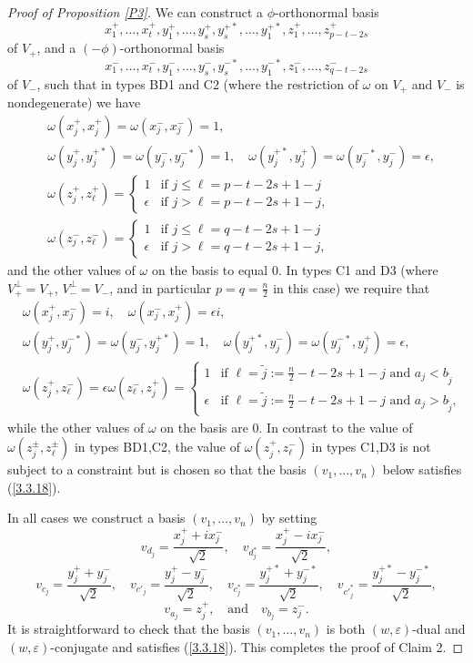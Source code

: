 \documentclass{amsart}
\theoremstyle{definition}
\begin{document}
\begin{proof}[Proof of Proposition \ref{P3}]
We can construct a $\phi$-orthonormal basis
\[x_1^+,\ldots,x_t^+,y^+_1,\ldots,y^+_s,y^{+*}_s,\ldots,y^{+*}_1,z^+_1,\ldots,z^+_{p-t-2s}\]
of $V_+$, and a $(-\phi)$-orthonormal basis
\[x_1^-,\ldots,x_t^-,y^-_1,\ldots,y^-_s,y^{-*}_s,\ldots,y^{-*}_1,z^-_1,\ldots,z^-_{q-t-2s}\]
of $V_-$,
such that in types BD1 and C2 (where the restriction of $\omega$ on $V_+$ and $V_-$ is nondegenerate) we have
\begin{eqnarray*}
 & \omega(x^+_j,x^+_j)=\omega(x^-_j,x^-_j)=1,\\ 
 & \omega(y^+_j,y^{+*}_j)=\omega(y^-_j,y^{-*}_j)=1,\quad\omega(y^{+*}_j,y^+_j)=\omega(y^{-*}_j,y^-_j)=\epsilon, \\
 & \omega(z^+_j,z^+_{\ell})=\left\{\begin{array}{ll} 1 & \mbox{if $j\leq \ell=p-t-2s+1-j$} \\ \epsilon & \mbox{if $j>\ell=p-t-2s+1-j, $} \end{array}\right.
\\
 & \omega(z^-_j,z^-_{\ell})=\left\{\begin{array}{ll} 1 & \mbox{if $j\leq \ell=q-t-2s+1-j$} \\ \epsilon & \mbox{if $j>\ell=q-t-2s+1-j, $} \end{array}\right.
\end{eqnarray*}
and the other values of $\omega$ on the basis to equal $0$.  In types C1 and D3 (where $V_+^\perp=V_+$, $V_-^\perp=V_-$, and in particular $p=q=\frac{n}{2}$ in this case) we require that
\begin{eqnarray*}
 & \omega(x^+_j,x^-_j)=i,\quad \omega(x^-_j,x^+_j)=\epsilon i,\\ 
 & \omega(y^+_j,y^{-*}_j)=\omega(y^-_j,y^{+*}_j)=1,\quad\omega(y^{+*}_j,y^-_j)=\omega(y^{-*}_j,y^+_j)=\epsilon, \\
 & \omega(z^+_j,z^-_{\ell})=\epsilon\omega(z^-_\ell,z^+_j)=\left\{\begin{array}{ll} 1 & \mbox{if $\ell=\tilde{j}:=\frac{n}{2}-t-2s+1-j$ and $a_j<b_{\tilde{j}}$} \\ \epsilon & \mbox{if $\ell=\tilde{j}:=\frac{n}{2}-t-2s+1-j$ and $a_j>b_{\tilde{j}}$,} \end{array}\right.
\end{eqnarray*}
while the other values of $\omega$ on the basis are $0$.
In contrast to the value of $\omega(z_j^\pm,z_\ell^\pm)$ in types BD1,C2, the value of $\omega(z_j^+,z_\ell^-)$ in types C1,D3 is not subject to a constraint but is chosen so that the basis $(v_1,\ldots,v_n)$ below satisfies (\ref{3.3.18}).

In all cases we construct a basis $(v_1,\ldots,v_n)$ by setting
\[v_{d_j}=\frac{x^+_j+ix^-_j}{\sqrt{2}},\quad v_{d_j^*}=\frac{x^+_j-ix^-_j}{\sqrt{2}},\]
\[v_{c_j}=\frac{y^+_j+y^-_j}{\sqrt{2}},\quad v_{c'_j}=\frac{y^+_j-y^-_j}{\sqrt{2}},\quad v_{c^*_j}=\frac{y^{+*}_j+y^{-*}_j}{\sqrt{2}},\quad v_{c'^*_j}=\frac{y^{+*}_j-y^{-*}_j}{\sqrt{2}},\]
\[v_{a_j}=z^+_j,\quad\mbox{and}\quad v_{b_j}=z_j^-.\]
It is straightforward to check that the basis $(v_1,\ldots,v_n)$ is both $(w,\varepsilon)$-dual and $(w,\varepsilon)$-conjugate and satisfies (\ref{3.3.18}). This completes the proof of Claim 2.
\end{proof}
\end{document}

